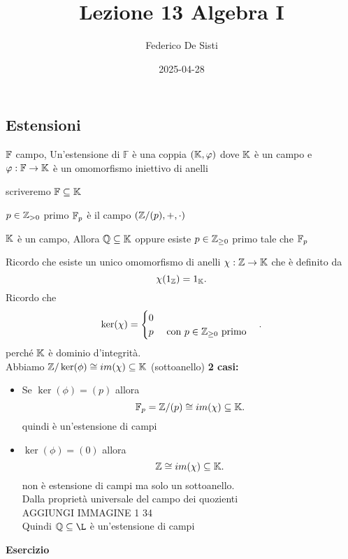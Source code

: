 \documentclass[12px]{article}
\title{Lezione 13 Algebra I}
\date{2025-04-28}
\author{Federico De Sisti}
\begin{document}
	\maketitle
	\newpage
	\subsection{Estensioni}
	\begin{defi}
		$\mathbb{F}$ campo, Un'estensione di $\mathbb F$ è una coppia  $(\mathbb{K}, \varphi)$ dove $\mathbb{K}$ è un campo e  $ \varphi: \mathbb{F} \rightarrow \mathbb{K}$ è un omomorfismo iniettivo di anelli
	\end{defi}
	\begin{nota}
		scriveremo $\mathbb{F}\subseteq \mathbb{K}$
	\end{nota}
	\begin{nota}
		$p\in\mathbb{Z}_{>0}$ primo  $\mathbb{F}_p$ è il campo $(\mathbb{Z}/(p), + ,\cdot)$
	\end{nota}
	\begin{prop}
		$\mathbb{K}$ è un campo, Allora $\mathbb{Q}\subseteq \mathbb{K}$ oppure esiste $p\in \mathbb{Z}_{\geq 0}$ primo tale che $\mathbb{F}_p$
	\end{prop}
	\begin{dimo}
		Ricordo che esiste un unico omomorfismo di anelli $\chi : \mathbb{Z} \rightarrow \mathbb{K}$ che è definito da 
		\[
		\chi(1_{\mathbb{Z}}) = 1_{\mathbb{K}}
		.\] 
		Ricordo che 
		\[
		\ker (\chi) = \begin{cases}
			0\\
			p\ \ \ \text{ con } p\in \mathbb{Z}_{\geq 0} \text{ primo}
		\end{cases}
		.\] 
		perché $\mathbb{K}$ è dominio d'integrità.\\
		Abbiamo  $\Z/\ker(\phi)\cong im(\chi)\subseteq \K\hfill$ (sottoanello)
		 \textbf{2 casi:}
		 \begin{itemize}
			 \item Se $\ker(\phi) = (p)$ allora 
				 \[
				 \mathbb{F}_p = \mathbb{Z}/(p)\cong im(\chi)\subseteq \mathbb{K}
				 .\] quindi è un'estensione di campi
			 \item $\ker(\phi) = (0)$ allora
				  \[
				 \mathbb{Z}\cong im(\chi)\subseteq \mathbb{K}
				 .\] 
				 non è estensione di campi ma solo un sottoanello.\\
				 Dalla proprietà universale del campo dei quozienti \\
				 AGGIUNGI IMMAGINE 1 34\\
				 Quindi $\Q\subseteq \L$ è un'estensione di campi
		 \end{itemize}
	\end{dimo}
	\textbf{Esercizio}\\
\end{document}
